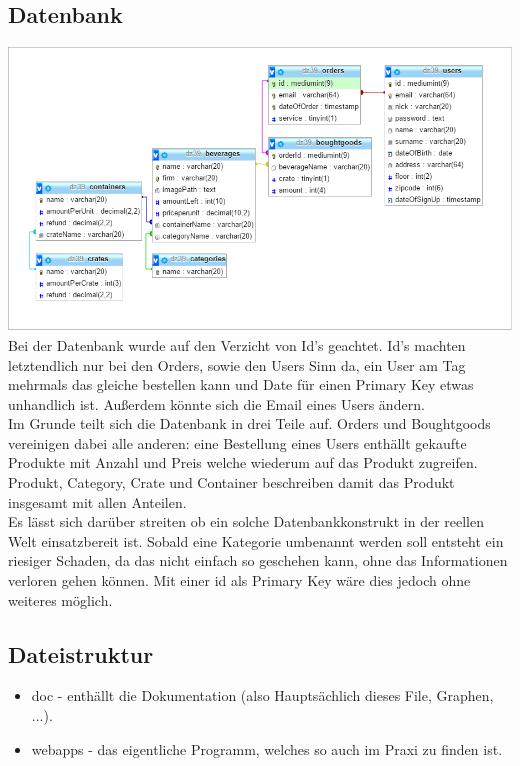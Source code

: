 \documentclass[a4paper, 11pt]{article}
\begin{document}
\subsection{Datenbank}
\includegraphics[width=\textwidth]{databaseDiagram.PNG}
Bei der Datenbank wurde auf den Verzicht von Id's geachtet. Id's machten letztendlich nur bei den Orders, sowie den Users Sinn da, ein User am Tag mehrmals das gleiche bestellen kann und Date für einen Primary Key etwas unhandlich ist. Außerdem könnte sich die Email eines Users ändern. \\
Im Grunde teilt sich die Datenbank in drei Teile auf. Orders und Boughtgoods vereinigen dabei alle anderen: eine Bestellung eines Users enthällt gekaufte Produkte mit Anzahl und Preis welche wiederum auf das Produkt zugreifen. Produkt, Category, Crate und Container beschreiben damit das Produkt insgesamt mit allen Anteilen. \\
Es lässt sich darüber streiten ob ein solche Datenbankkonstrukt in der reellen Welt einsatzbereit ist. Sobald eine Kategorie umbenannt werden soll entsteht ein riesiger Schaden, da das nicht einfach so geschehen kann, ohne das Informationen verloren gehen können. Mit einer id als Primary Key wäre dies jedoch ohne weiteres möglich.
\subsection{Dateistruktur}
\begin{itemize}
\item doc - enthällt die Dokumentation (also Hauptsächlich dieses File, Graphen, ...).
\item webapps - das eigentliche Programm, welches so auch im Praxi zu finden ist.
\end{itemize}
\end{document}
